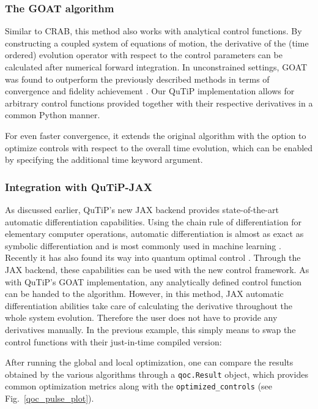 \documentclass[preprint,3p,sort&compress]{elsarticle}
\def\code#1{\texttt{#1}}
\begin{document}
\subsubsection{The GOAT algorithm}
Similar to CRAB, this method also works with analytical control functions. By constructing a coupled system of equations of motion, the derivative of the (time ordered) evolution operator with respect to the control parameters can be calculated after numerical forward integration. In unconstrained settings, GOAT was found to outperform the previously described methods in terms of convergence and fidelity achievement \cite{riaz_optimal_2019}.
Our QuTiP implementation allows for arbitrary control functions provided together with their respective derivatives in a common Python manner.


For even faster convergence, it extends the original algorithm with the option to optimize controls with respect to the overall time evolution, which can be enabled by specifying the additional time keyword argument.
\newpage
{}

\subsubsection{Integration with QuTiP-JAX}
As discussed earlier, QuTiP's new JAX backend provides state-of-the-art automatic differentiation capabilities.  Using the chain rule of differentiation for elementary computer operations, automatic differentiation is almost as exact as symbolic differentiation and is most commonly used in machine learning \cite{BaydinPR15}.
Recently it has also found its way into quantum optimal control \cite{Song22}.
Through the JAX backend, these capabilities can be used with the new control framework. 
As with QuTiP's GOAT implementation, any analytically defined control function can be handed to the algorithm. 
However, in this method, JAX automatic differentiation abilities take care of calculating the derivative throughout the whole system evolution. 
Therefore the user does not have to provide any derivatives manually. 
In the previous example, this simply means to swap the control functions with their just-in-time compiled version:


After running the global and local optimization, one can compare the results obtained by the various algorithms through a \code{qoc.Result} object, which provides common optimization metrics along with the \code{optimized\_controls} (see Fig.~\ref{qoc_pulse_plot}).
\end{document}
